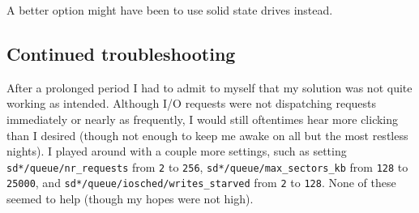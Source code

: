 \documentclass{article}
\begin{document}
A better option might have been to use solid state drives instead.

\subsection{Continued troubleshooting}

After a prolonged period I had to admit to myself that my solution was not quite working as intended.  Although I/O requests were not dispatching requests immediately or nearly as frequently, I would still oftentimes hear more clicking than I desired (though not enough to keep me awake on all but the most restless nights).  I played around with a couple more settings, such as setting \texttt{sd*/queue/nr_requests} from \texttt{2} to \texttt{256}, \texttt{sd*/queue/max_sectors_kb} from \texttt{128} to \texttt{25000}, and \texttt{sd*/queue/iosched/writes_starved} from \texttt{2} to \texttt{128}.  None of these seemed to help (though my hopes were not high).
\end{document}
